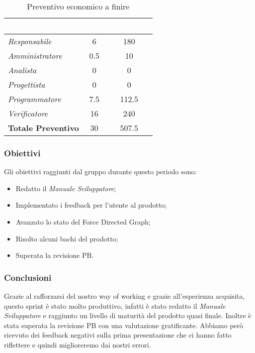 \begin{table}[H]
    \renewcommand\arraystretch{1.5}
    \centering
    \begin{tabular}{|l|c|c|}
    \hline
    \rowcolor[HTML]{036400}
    \textcolor{white}{\textbf{Ruolo}} & \multicolumn{1}{l|}{\textcolor{white}{\textbf{Ore}}} & \multicolumn{1}{l|}{\textcolor{white}{\textbf{Costo (€)}}} \\ \hline
    \rowcolor[HTML]{EFEFEF}\textit{Responsabile}      & 6            & 180               \\ \hline
    \rowcolor[HTML]{C0C0C0}\textit{Amministratore}    & 0.5          & 10                \\ \hline
    \rowcolor[HTML]{EFEFEF}\textit{Analista}          & 0            & 0                 \\ \hline
    \rowcolor[HTML]{C0C0C0}\textit{Progettista}       & 0            & 0                \\ \hline
    \rowcolor[HTML]{EFEFEF}\textit{Programmatore}     & 7.5          & 112.5               \\ \hline
    \rowcolor[HTML]{C0C0C0}\textit{Verificatore}      & 16           & 240             \\ \hline
    \rowcolor[HTML]{EFEFEF}\textbf{Totale Preventivo} & 30          & 507.5            \\ \hline
    \end{tabular}
    \caption{Preventivo economico a finire}
\end{table}

\subsubsection{Obiettivi}
Gli obiettivi raggiunti dal gruppo durante questo periodo sono:
\begin{itemize}
    \item Redatto il \textit{Manuale Sviluppatore};
    \item Implementato i feedback per l'utente al prodotto;
    \item Avanzato lo stato del Force Directed Graph;
    \item Risolto alcuni bachi del prodotto;
    \item Superata la revisione PB.
\end{itemize}

\subsubsection{Conclusioni}
Grazie al rafforzarsi del nostro way of working e grazie all'esperienza acquisita, questo sprint è stato molto produttivo, infatti è stato redatto il \textit{Manuale Sviluppatore} e raggiunto un livello di maturità del prodotto quasi finale. Inoltre è stata superata la revisione PB con una valutazione gratificante. Abbiamo però ricevuto dei feedback negativi sulla prima presentazione che ci hanno fatto riflettere e quindi miglioreremo dai nostri errori.
